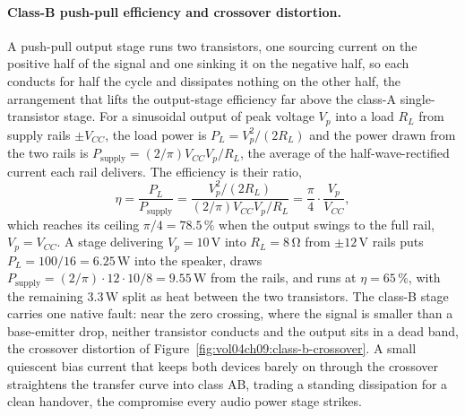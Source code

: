 \paragraph{Class-B push-pull efficiency and crossover distortion.}
A push-pull output stage runs two transistors, one sourcing current on the
positive half of the signal and one sinking it on the negative half, so each
conducts for half the cycle and dissipates nothing on the other half, the
arrangement that lifts the output-stage efficiency far above the class-A
single-transistor stage. For a sinusoidal output of peak voltage $V_p$ into a
load $R_L$ from supply rails $\pm V_{CC}$, the load power is $P_L =
V_p^2/(2R_L)$ and the power drawn from the two rails is $P_{\text{supply}} =
(2/\pi)V_{CC}V_p/R_L$, the average of the half-wave-rectified current each rail
delivers. The efficiency is their ratio,
\[
\eta = \frac{P_L}{P_{\text{supply}}}
= \frac{V_p^2/(2R_L)}{(2/\pi)V_{CC}V_p/R_L}
= \frac{\pi}{4}\cdot\frac{V_p}{V_{CC}},
\]
which reaches its ceiling $\pi/4 = 78.5\,\%$ when the output swings to the full
rail, $V_p = V_{CC}$. A stage delivering $V_p = 10\,\si{\volt}$ into
$R_L = 8\,\si{\ohm}$ from $\pm 12\,\si{\volt}$ rails puts $P_L = 100/16 =
6.25\,\si{\watt}$ into the speaker, draws $P_{\text{supply}} = (2/\pi)\cdot 12
\cdot 10/8 = 9.55\,\si{\watt}$ from the rails, and runs at $\eta = 65\,\%$, with
the remaining $3.3\,\si{\watt}$ split as heat between the two transistors. The
class-B stage carries one native fault: near the zero crossing, where the signal
is smaller than a base-emitter drop, neither transistor conducts and the output
sits in a dead band, the crossover distortion of
Figure~\ref{fig:vol04ch09:class-b-crossover}. A small quiescent bias current that
keeps both devices barely on through the crossover straightens the transfer
curve into class AB, trading a standing dissipation for a clean handover, the
compromise every audio power stage strikes.


